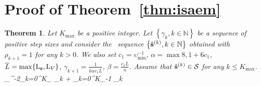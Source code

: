 \documentclass[11pt]{article}
\newtheorem*{Theorem*}{Theorem}
\theoremstyle{t}
\begin{document}
\section{Proof of Theorem~\ref{thm:isaem}}\label{app:theoremisaem}
\begin{Theorem*}
Let $K_{\max }$ be a positive integer. 
Let $\left\{\gamma_{k}, k \in \mathbb{N}\right\}$ be a sequence of positive step sizes and consider the \ISAEM\ sequence $\left\{\hat{{\mathbf{s}}}^{(k)}, k \in \mathbb{N}\right\}$ obtained with $\rho_{k+1}=1$ for any $k>0$. We also set $c_1 = \upsilon_{\min}^{-1}$, $\alpha = \max{8, 1+6c_1}$, $\overline{L} = \max\{ \operatorname{L}_{{\mathbf{s}}} , \operatorname{L}_{V} \}$, $\gamma_{k+1} = \frac{1}{k \alpha c_1 \overline{L}}$, $\beta = \frac{c_1 \overline{L}}{n}$. 
Assume that $ \hat{{\mathbf{s}}}^{(k)} \in \mathcal{S}$ for any $k \leq K_{\max }$.
\beq
\upsilon_{\max}^{-2}\sum_{k=0}^{K_{\max}} \tilde{\alpha}_k \EE {}  \leq   \EE \left[ V( \hs{0} ) - V( \hs{K} ) \right]+ \sum_{k=0}^{K_{\max}-1} \tilde{\Gamma}_k         \EE {} 
\eeq
\end{Theorem*} 
\end{document}
